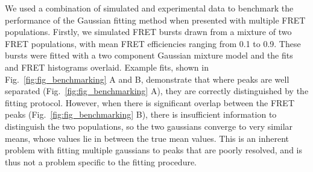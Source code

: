 We used a combination of simulated and experimental data to benchmark the performance of the Gaussian fitting method when presented with multiple FRET populations. Firstly, we simulated FRET bursts drawn from a mixture of two FRET populations, with mean FRET efficiencies ranging from 0.1 to 0.9. These bursts were fitted with a two component Gaussian mixture model and the fits and FRET histograms overlaid. Example fits, shown in Fig.~\ref{fig:fig_benchmarking} A and B, demonstrate that where peaks are well separated (Fig.~\ref{fig:fig_benchmarking} A), they are correctly distinguished by the fitting protocol. However, when there is significant overlap between the FRET peaks (Fig.~\ref{fig:fig_benchmarking} B), there is insufficient information to distinguish the two populations, so the two gaussians converge to very similar means, whose values lie in between the true mean values. This is an inherent problem with fitting multiple gaussians to peaks that are poorly resolved, and is thus not a problem specific to the fitting procedure.

